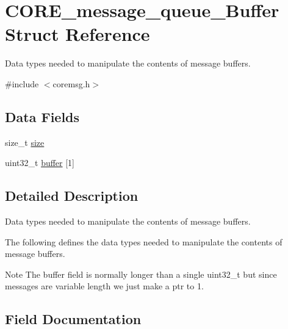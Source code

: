 \hypertarget{structCORE__message__queue__Buffer}{}\section{C\+O\+R\+E\+\_\+message\+\_\+queue\+\_\+\+Buffer Struct Reference}
\label{structCORE__message__queue__Buffer}


Data types needed to manipulate the contents of message buffers.  




{\ttfamily \#include $<$coremsg.\+h$>$}

\subsection*{Data Fields}
\begin{DoxyCompactItemize}
\item 
size\+\_\+t \mbox{\hyperlink{structCORE__message__queue__Buffer_a3d2e6882ac8a3d14030b3142404cea22}{size}}
\item 
uint32\+\_\+t \mbox{\hyperlink{structCORE__message__queue__Buffer_a352b029a547968ab04cafd1f01099439}{buffer}} \mbox{[}1\mbox{]}
\end{DoxyCompactItemize}


\subsection{Detailed Description}
Data types needed to manipulate the contents of message buffers. 

The following defines the data types needed to manipulate the contents of message buffers.

\begin{DoxyNote}{Note}
The buffer field is normally longer than a single uint32\+\_\+t but since messages are variable length we just make a ptr to 1. 
\end{DoxyNote}


\subsection{Field Documentation}
\mbox{\label{structCORE__message__queue__Buffer_a352b029a547968ab04cafd1f01099439}} 
